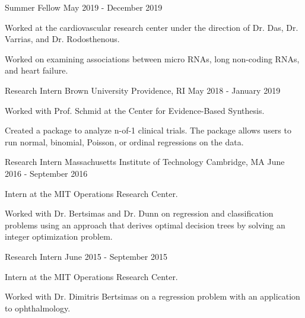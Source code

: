 \begin{cventries}
  \cventry
    {Summer Fellow} %
    {} %
    {} %
    {May 2019 - December 2019} %
    {
      \begin{cvitems} %
        \item {Worked at the cardiovascular research center under the direction of Dr. Das, Dr. Varrias, and Dr. Rodosthenous.} 
        \item {Worked on examining associations between micro RNAs, long non-coding RNAs, and heart failure.}
      \end{cvitems}
    }

\vspace{-1mm}
  \cventry
    {Research Intern} %
    {Brown University} %
    {Providence, RI} %
    {May 2018 - January 2019} %
    {
      \begin{cvitems} %
        \item {Worked with Prof. Schmid at the Center for Evidence-Based Synthesis.} 
        \item {Created a package to analyze n-of-1 clinical trials. The package
        allows users to run normal, binomial, Poisson, or ordinal regressions
        on the data.}
      \end{cvitems}
    }

  \cventry
    {Research Intern} %
    {Massachusetts Institute of Technology} %
    {Cambridge, MA} %
    {June 2016 - September 2016} %
    {
      \begin{cvitems} %
        \item {Intern at the MIT Operations Research Center.}
        \item {Worked with Dr. Bertsimas and Dr. Dunn on regression and
        classification problems using an approach that derives optimal decision
        trees by solving an integer optimization problem.}
      \end{cvitems}
    }

  \cventry
    {Research Intern} %
    {} %
    {} %
    {June 2015 - September 2015} %
    {
      \begin{cvitems} %
        \item {Intern at the MIT Operations Research Center.}
        \item {Worked with Dr. Dimitris Bertsimas on a regression problem
        with an application to ophthalmology.}
      \end{cvitems}
    }

\end{cventries}
